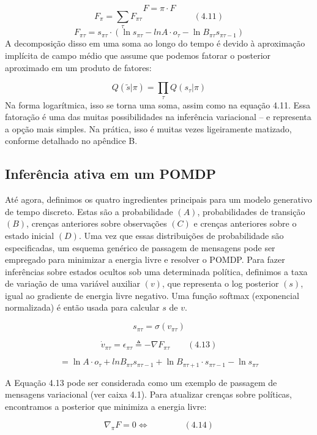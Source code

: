 \documentclass[
  12pt,
]{book}
\begin{document}
\[F = \pi \cdot F \]
\[F_\pi = \sum_\tau F_{\pi\tau} \qquad\qquad\qquad (4.11)\]
\[F_{\pi\tau}=s_{\pi\tau} \cdot (\ln s_{\pi \tau} - ln A \cdot o_\tau - \ln B_{\pi\tau}s_{\pi\tau-1})\]
A decomposição disso em uma soma ao longo do tempo é devido à
aproximação implícita de campo médio que assume que podemos fatorar o
posterior aproximado em um produto de fatores:

\[Q(\tilde s | \pi) = \prod_\tau Q(s_\tau|\pi)\] Na forma logarítmica,
isso se torna uma soma, assim como na equação 4.11. Essa fatoração é uma
das muitas possibilidades na inferência variacional -- e representa a
opção mais simples. Na prática, isso é muitas vezes ligeiramente
matizado, conforme detalhado no apêndice B.

\hypertarget{inferuxeancia-ativa-em-um-pomdp}{%
\subsection{Inferência ativa em um POMDP}\label{inferuxeancia-ativa-em-um-pomdp}}

Até agora, definimos os quatro ingredientes principais para um modelo
generativo de tempo discreto. Estas são a probabilidade \((A)\),
probabilidades de transição \((B)\), crenças anteriores sobre observações
\((C)\) e crenças anteriores sobre o estado inicial \((D)\). Uma vez que
essas distribuições de probabilidade são especificadas, um esquema
genérico de passagem de mensagens pode ser empregado para minimizar a
energia livre e resolver o POMDP. Para fazer inferências sobre estados
ocultos sob uma determinada política, definimos a taxa de variação de
uma variável auxiliar \((v)\), que representa o log posterior \((s)\), igual
ao gradiente de energia livre negativo. Uma função softmax (exponencial
normalizada) é então usada para calcular \(s\) de \(v\).

\[s_{\pi\tau}=\sigma(v_{\pi\tau})\]

\[\dot v_{\pi\tau} =\epsilon_{\pi\tau} \triangleq - \nabla F_{\pi\tau} \qquad (4.13)\]

\[ =\ln A \cdot o_\tau + ln B_{\pi\tau}s_{\pi\tau-1} + \ln B_{\pi\tau+1} \cdot s_{\pi\tau-1} - \ln s_{\pi\tau}  \]

A Equação 4.13 pode ser considerada como um exemplo de passagem de
mensagens variacional (ver caixa 4.1). Para atualizar crenças sobre
políticas, encontramos a posterior que minimiza a energia livre:

\[ \nabla_\pi F = 0 \Longleftrightarrow  \qquad \qquad (4.14)\]
\end{document}
